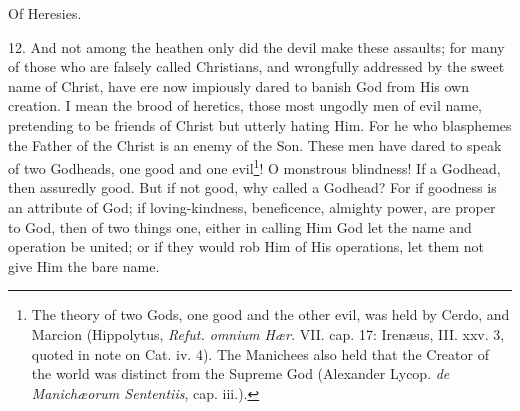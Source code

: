 Of Heresies.

12. And not among the heathen only did the devil make these assaults; for many of those who are falsely called Christians, and wrongfully addressed by the sweet name of Christ, have ere now impiously dared to banish God from His own creation. I mean the brood of heretics, those most ungodly men of evil name, pretending to be friends of Christ but utterly hating Him. For he who blasphemes the Father of the Christ is an enemy of the Son. These men have dared to speak of two Godheads, one good and one evil\footnote{The theory of two Gods, one good and the other evil, was held by Cerdo, and Marcion (Hippolytus, \emph{Refut. omnium Hær.} VII. cap. 17: Irenæus, III. xxv. 3, quoted in note on Cat. iv. 4). The Manichees also held that the Creator of the world was distinct from the Supreme God (Alexander Lycop. \emph{de Manichæorum Sententiis}, cap. iii.).}! O monstrous blindness! If a Godhead, then assuredly good. But if not good, why called a Godhead? For if goodness is an attribute of God; if loving-kindness, beneficence, almighty power, are proper to God, then of two things one, either in calling Him God let the name and operation be united; or if they would rob Him of His operations, let them not give Him the bare name.

